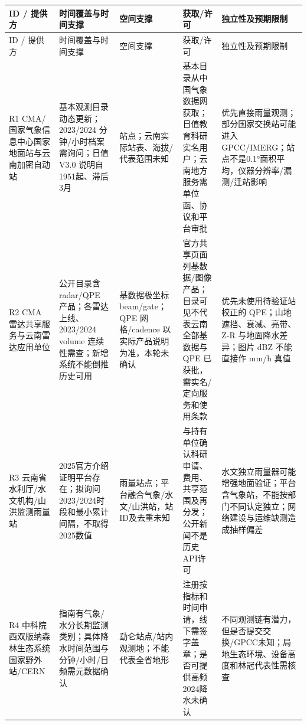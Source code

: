 \documentclass[UTF8,fontset=fandol,10pt]{ctexart}
\begin{document}
\begingroup\small\setlength{\tabcolsep}{3pt}\renewcommand{\arraystretch}{1.12}
\begin{longtable}{>{\raggedright\arraybackslash}p{\dimexpr(\linewidth-10\tabcolsep)/5\relax}>{\raggedright\arraybackslash}p{\dimexpr(\linewidth-10\tabcolsep)/5\relax}>{\raggedright\arraybackslash}p{\dimexpr(\linewidth-10\tabcolsep)/5\relax}>{\raggedright\arraybackslash}p{\dimexpr(\linewidth-10\tabcolsep)/5\relax}>{\raggedright\arraybackslash}p{\dimexpr(\linewidth-10\tabcolsep)/5\relax}}
\toprule
ID /\allowbreak{} 提供方 & 时间覆盖与时间支撑 & 空间支撑 & 获取/\allowbreak{}许可 & 独立性及预期限制 \\
\midrule\endfirsthead
ID /\allowbreak{} 提供方 & 时间覆盖与时间支撑 & 空间支撑 & 获取/\allowbreak{}许可 & 独立性及预期限制 \\
\midrule\endhead
R1 CMA/\allowbreak{}国家气象信息中心国家地面站与云南加密自动站 & 基本观测目录动态更新；2023/\allowbreak{}2024 分钟/\allowbreak{}小时档案需询问；日值 V3.0 说明自1951起、滞后3月 & 站点；云南实际站表、海拔/\allowbreak{}代表范围未知 & 基本目录从中国气象数据网获取；日值教育科研实名用户；云南地方服务需单位函、协议和平台审批 & 优先直接雨量观测；部分国家交换站可能进入 GPCC/\allowbreak{}IMERG；站点不是0.1°面积平均，仪器分辨率/\allowbreak{}漏测/\allowbreak{}迁站影响 \\
R2 CMA 雷达共享服务与云南雷达应用单位 & 公开目录含 radar/\allowbreak{}QPE 产品；各雷达上线、2023/\allowbreak{}2024 volume 连续性需查；新增系统不能倒推历史可用 & 基数据极坐标 beam/\allowbreak{}gate；QPE 网格/\allowbreak{}cadence 以实际产品说明为准，本轮未确认 & 官方共享页面列基数据/\allowbreak{}图像产品；目录可见不代表云南全部基数据与 QPE 已获批，需实名/\allowbreak{}定向服务和使用条款 & 优先未使用待验证站校正的 QPE；山地遮挡、衰减、亮带、Z-R 与地面降水差异；图片 dBZ 不能直接作 mm/\allowbreak{}h 真值 \\
R3 云南省水利厅/\allowbreak{}水文机构/\allowbreak{}山洪监测雨量站 & 2025官方介绍证明平台存在；拟询问2023/\allowbreak{}2024时段和最小累计间隔，不取得2025数值 & 雨量站点；平台融合气象/\allowbreak{}水文/\allowbreak{}山洪站，站ID及去重未知 & 与持有单位确认科研申请、费用、共享范围及再分发；公开新闻不是历史API许可 & 水文独立雨量器可能增强地面验证；平台含气象站，不能按部门不同认定独立；网络建设与运维缺测造成抽样偏差 \\
R4 中科院西双版纳森林生态系统国家野外站/\allowbreak{}CERN & 指南有气象/\allowbreak{}水分长期监测类别；具体降水时间范围与分钟/\allowbreak{}小时/\allowbreak{}日频需元数据确认 & 勐仑站点/\allowbreak{}站内观测地；不能代表全省地形 & 注册按指标和时间申请，线下需签字盖章；是否可提供高频2024降水未确认 & 不同观测链有潜力，但是否提交交换/\allowbreak{}GPCC未知；局地生态环境、设备高度和林冠代表性需核查 \\
\bottomrule\end{longtable}\endgroup
\end{document}
